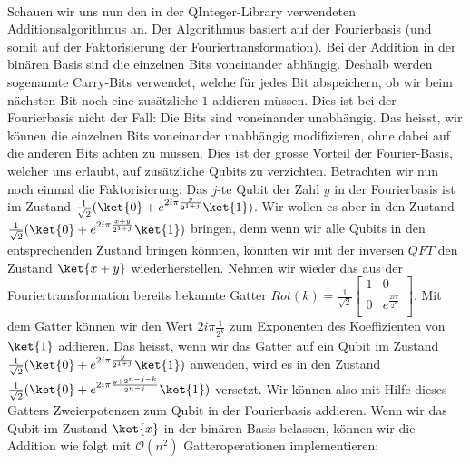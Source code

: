 \paragraph{}

Schauen wir uns nun den in der QInteger-Library verwendeten Additionsalgorithmus an. Der Algorithmus basiert auf der Fourierbasis (und somit auf der Faktorisierung der Fouriertransformation). Bei der Addition in der binären Basis sind die einzelnen Bits voneinander abhängig. Deshalb werden sogenannte Carry-Bits verwendet, welche für jedes Bit abspeichern, ob wir beim nächsten Bit noch eine zusätzliche $1$ addieren müssen. Dies ist bei der Fourierbasis nicht der Fall: Die Bits sind voneinander unabhängig. Das heisst, wir können die einzelnen Bits voneinander unabhängig modifizieren, ohne dabei auf die anderen Bits achten zu müssen. Dies ist der grosse Vorteil der Fourier-Basis, welcher uns erlaubt, auf zusätzliche Qubits zu verzichten. Betrachten wir nun noch einmal die Faktorisierung: Das $j$-te Qubit der Zahl $y$ in der Fourierbasis ist im Zustand $\frac{1}{\sqrt{2}}(\ket{0} + e^{2i\pi\frac{y}{2^{1 + j}}}\ket{1})$. Wir wollen es aber in den Zustand $\frac{1}{\sqrt{2}}(\ket{0} + e^{2i\pi\frac{x + y}{2^{1 + j}}}\ket{1})$ bringen, denn wenn wir alle Qubits in den entsprechenden Zustand bringen könnten, könnten wir mit der inversen $QFT$ den Zustand $\ket{x + y}$ wiederherstellen. Nehmen wir wieder das aus der Fouriertransformation bereits bekannte Gatter $Rot(k) = \frac{1}{\sqrt{2}}\begin{bmatrix}
    1 & 0 \\
    0 & e^{\frac{2i\pi}{2^k}} \\
\end{bmatrix}$. Mit dem Gatter können wir den Wert $2i\pi\frac{1}{2^k}$ zum Exponenten des Koeffizienten von $\ket{1}$ addieren. Das heisst, wenn wir das Gatter auf ein Qubit im Zustand $\frac{1}{\sqrt{2}}(\ket{0} + e^{2i\pi\frac{y}{2^{1 + j}}}\ket{1})$ anwenden, wird es in den Zustand $\frac{1}{\sqrt{2}}(\ket{0} + e^{2i\pi\frac{y + 2^{n - j - k}}{2^{n - j}}}\ket{1})$ versetzt. Wir können also mit Hilfe dieses Gatters Zweierpotenzen zum Qubit in der Fourierbasis addieren. Wenn wir das Qubit im Zustand $\ket{x}$ in der binären Basis belassen, können wir die Addition wie folgt mit $\mathcal O(n^2)$ Gatteroperationen implementieren:
